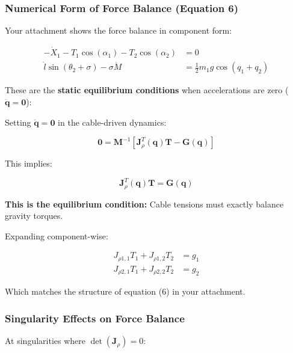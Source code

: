 \subsubsection{Numerical Form of Force Balance (Equation 6)}

Your attachment shows the force balance in component form:

\begin{equation}
\boxed{\begin{aligned}
-\dot{X}_1 - T_1 \cos(\alpha_1) - T_2 \cos(\alpha_2) &= 0 \\
\dot{l} \sin(\theta_2 + \sigma) - \sigma \dot{M} &= \frac{1}{2} m_1 g \cos(q_1 + q_2)
\end{aligned}}
\end{equation}

These are the \textbf{static equilibrium conditions} when accelerations are zero ($\ddot{\mathbf{q}} = \mathbf{0}$):

Setting $\ddot{\mathbf{q}} = \mathbf{0}$ in the cable-driven dynamics:

\begin{equation}
\mathbf{0} = \mathbf{M}^{-1} \left[ \mathbf{J}_{\rho}^T(\mathbf{q}) \mathbf{T} - \mathbf{G}(\mathbf{q}) \right]
\end{equation}

This implies:

\begin{equation}
\mathbf{J}_{\rho}^T(\mathbf{q}) \mathbf{T} = \mathbf{G}(\mathbf{q})
\end{equation}

\textbf{This is the equilibrium condition:} Cable tensions must exactly balance gravity torques.

Expanding component-wise:

\begin{align}
J_{\rho 1,1} T_1 + J_{\rho 1,2} T_2 &= g_1 \\
J_{\rho 2,1} T_1 + J_{\rho 2,2} T_2 &= g_2
\end{align}

Which matches the structure of equation (6) in your attachment.

\subsubsection{Singularity Effects on Force Balance}

At singularities where $\det(\mathbf{J}_{\rho}) = 0$:

